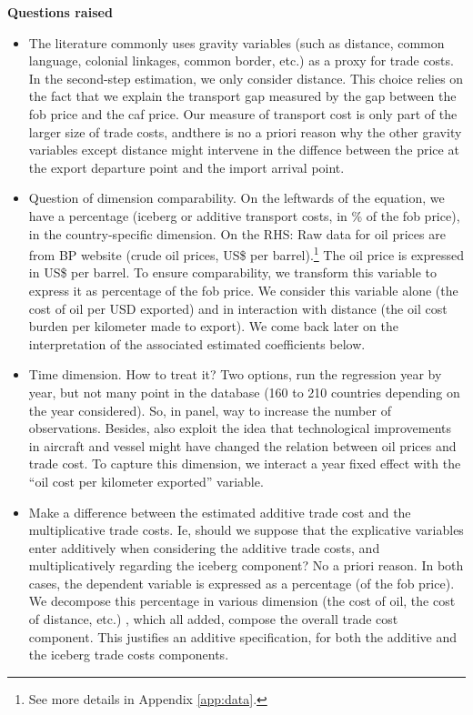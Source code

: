 \documentclass[a4paper,11pt]{article}
\begin{document}
\textbf{Questions raised} \medskip
\begin{itemize}
\item The literature commonly uses gravity variables (such as distance, common language, colonial linkages, common border, etc.) as a proxy for trade costs. In the second-step estimation, we only consider distance. This choice relies on the fact that we explain the transport gap measured by the gap between the fob price and the caf price. Our measure of transport cost is only part of the larger size of trade costs, andthere is no a priori reason why the other gravity variables except distance might intervene in the diffence between the price at the export departure point and the import arrival point.


\item Question of dimension comparability. On the leftwards of the equation, we have a percentage (iceberg or additive transport costs, in \% of the fob price), in the country-specific dimension. On the RHS: Raw data for oil prices are from BP website (crude oil prices, US\$ per barrel).\footnote{See more details in Appendix \ref{app:data}.} The oil price is expressed in US\$ per barrel. To ensure comparability, we transform this variable to express it as percentage of the fob price. We consider this variable alone (the cost of oil per USD exported) and in interaction with distance (the oil cost burden per kilometer made to export). We come back later on the interpretation of the associated estimated coefficients below.

\item Time dimension. How to treat it? Two options, run the regression year by year, but not many point in the database (160 to 210 countries depending on the year considered). So, in panel, way to increase the number of observations. Besides, also exploit the idea that technological improvements in aircraft and vessel might have changed the relation between oil prices and trade cost. To capture this dimension, we interact a year fixed effect with the ``oil cost per kilometer exported'' variable.

\item Make a difference between the estimated additive trade cost and the multiplicative trade costs. Ie, should we suppose that the explicative variables enter additively when considering the additive trade costs, and multiplicatively regarding the iceberg component? No a priori reason. In both cases, the dependent variable is expressed as a percentage (of the fob price). We decompose this percentage in various dimension (the cost of oil, the cost of distance, etc.) , which all added, compose the overall trade cost component. This justifies an additive specification, for both the additive and the iceberg trade costs components.


\end{itemize}
\end{document}
